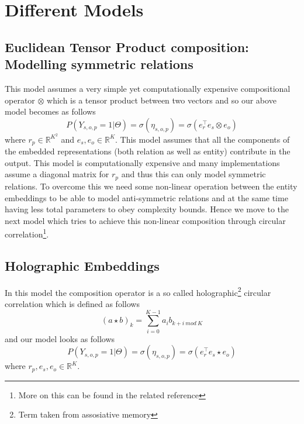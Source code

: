 \documentclass[12pt]{article}
\begin{document}
\section{Different Models}
\subsection{Euclidean Tensor Product composition: Modelling symmetric relations}
This model assumes a very simple yet computationally expensive compositional operator $\otimes$ which is a tensor product between two vectors and so our above model becomes as follows 
\begin{equation}
P(Y_{s, o, p}=1 | \Theta) = \sigma(\eta_{s, o, p}) = \sigma(e_{r}^{\intercal}e_{s}\otimes e_{o})
\end{equation} where $r_{p} \in \mathbb{R}^{K^2}$ and $e_{s}, e_{o} \in \mathbb{R}^{K}$. This model assumes that all the components of the embedded representations (both relation as well as entity) contribute in the output. This model is computationally expensive and many implementations assume a diagonal matrix for $r_{p}$ and thus this can only model symmetric relations. To overcome this we need some non-linear operation between the entity embeddings to be able to model anti-symmetric relations and at the same time having less total parameters to obey complexity bounds. Hence we move to the next model which tries to achieve this non-linear composition through circular correlation\footnote{More on this can be found in the related reference}.
\subsection{Holographic Embeddings}
In this model the composition operator is a so called holographic\footnote{Term taken from assosiative memory} circular correlation which is defined as follows
\begin{equation}
(a \star b)_{k} = \sum_{i=0}^{K-1}a_{i}b_{k+i\ mod\ K}
\end{equation} and our model looks as follows
\begin{equation}
P(Y_{s, o, p}=1 | \Theta) = \sigma(\eta_{s, o, p}) = \sigma(e_{r}^{\intercal}e_{s}\star e_{o})
\end{equation} where $r_{p}, e_{s}, e_{o} \in \mathbb{R}^{K}$.
\end{document}
